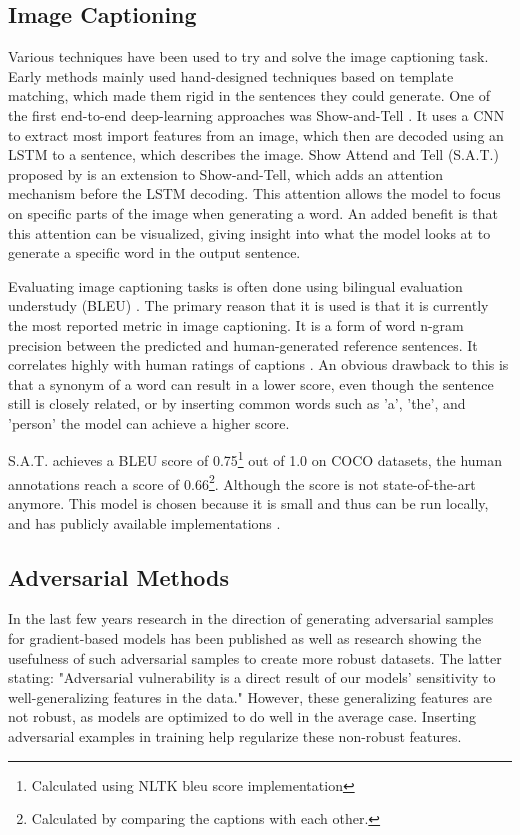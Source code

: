 \subsection*{Image Captioning}
Various techniques have been used to try and solve the image captioning task. Early methods mainly used hand-designed techniques based on template matching, which made them rigid in the sentences they could generate. One of the first end-to-end deep-learning approaches was Show-and-Tell \cite{showandtell}. It uses a CNN to extract most import features from an image, which then are decoded using an LSTM \cite{lstm} to a sentence, which describes the image.
Show Attend and Tell (S.A.T.) proposed by \citeauthor{xu2016show} is an extension to Show-and-Tell, which adds an attention mechanism before the LSTM decoding. This attention allows the model to focus on specific parts of the image when generating a word. An added benefit is that this attention can be visualized, giving insight into what the model looks at to generate a specific word in the output sentence.

Evaluating image captioning tasks is often done using bilingual evaluation understudy (BLEU) \cite{papineni_roukos_ward_zhu_2001}. The primary reason that it is used is that it is currently the most reported metric in image captioning. It is a form of word n-gram precision between the predicted and human-generated reference sentences. It correlates highly with human ratings of captions \cite{showandtell}. An obvious drawback to this is that a synonym of a word can result in a lower score, even though the sentence still is closely related, or by inserting common words such as 'a', 'the', and 'person' the model can achieve a higher score.

S.A.T. achieves a BLEU score of 0.75\footnote[1]{Calculated using NLTK\cite{nltk} bleu score implementation} out of 1.0 on COCO\cite{lin2015microsoft} datasets, the human annotations reach a score of 0.66\footnote[2]{Calculated by comparing the captions with each other.}. Although the score is not state-of-the-art\cite{DBLP:journals/corr/abs-2107-06912} anymore. This model is chosen because it is small and thus can be run locally, and has publicly available implementations \cite{sgrvinod}.

\subsection*{Adversarial Methods}
In the last few years research in the direction of generating adversarial samples for gradient-based models has been published \cite{goodfellow2015explaining,Kurakin} as well as research showing the usefulness of such adversarial samples\cite{Ilyas2019features} to create more robust datasets. The latter stating: "Adversarial vulnerability is a direct result of our models' sensitivity to well-generalizing features in the data." However, these generalizing features are not robust, as models are optimized to do well in the average case. Inserting adversarial examples in training help regularize these non-robust features\cite{https://doi.org/10.48550/arxiv.1611.01236}.

